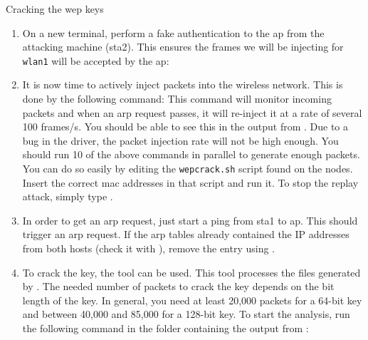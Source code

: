 \begin{exercise}{Cracking the \ac{wep} keys}
\begin{enumerate}
		This should give you an overview screen where at least the incoming beacon count is rising. If no activity is shown, bring the interface down and then bring it up again and retry. This command will store its captured frames in files  and . Make sure to run this command in \texttt{/mnt}, where a remote location is mounted.\newline
		\item On a new terminal, perform a fake authentication to the \ac{ap} from the attacking machine (\ac{sta}2). This ensures the frames we will be injecting for \texttt{wlan1} will be accepted by the \ac{ap}:\newline
		\item It is now time to actively inject packets into the wireless network. This is done by the following command:
		 \newline
		 This command will monitor incoming packets and when an \ac{arp} request passes, it will re-inject it at a rate of several 100 frames/s.  You should be able to see this in the output from .\newline
		 \remark Due to a bug in the driver, the packet injection rate will not be high enough. You should run 10 of the above  commands in parallel to generate enough packets. You can do so easily by editing the \texttt{wepcrack.sh} script found on the nodes. Insert the correct \ac{mac} addresses in that script and run it. To stop the replay attack, simply type .
		  \item In order to get an \ac{arp} request, just start a ping from \ac{sta}1 to \ac{ap}. This should trigger an \ac{arp} request. If the \ac{arp} tables already contained the IP addresses from both hosts (check it with ), remove the entry using .
		 \item To crack the key, the tool  can be used. This tool processes the files generated by . The needed number of packets to crack the key depends on the bit length of the key. In general, you need at least 20,000 packets for a 64-bit key and between 40,000 and 85,000 for a 128-bit key. To start the analysis, run the following command in the folder containing the output from :\newline

\end{enumerate}
\end{exercise}
